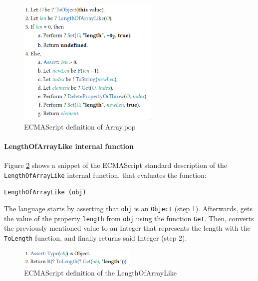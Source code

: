 \documentclass[runningheads]{llncs}
\begin{document}
\begin{figure}[ht]
    \centering
    \includegraphics[width=0.6\textwidth]{images/array_pop.png}
    \caption{ECMAScript definition of Array.pop}
    \label{fig:Array_pop}
\end{figure}



\paragraph*{LengthOfArrayLike internal function}
Figure \ref{fig:LengthOfArrayLike} shows a snippet of the ECMAScript standard description of the \texttt{LengthOfArrayLike} internal function, that evaluates the function:

\begin{center}
\texttt{LengthOfArrayLike (obj)}
\end{center}

\noindent The language starts by asserting that \texttt{obj} is an \texttt{Object} (step 1). Afterwards, gets the value of the property \texttt{length} from \texttt{obj} using the function \texttt{Get}. Then, converts the previously mentioned value to an Integer that represents the length with the \texttt{ToLength} function, and finally returns said Integer (step 2).

\begin{figure}[ht]
    \centering
    \includegraphics[width=0.5\textwidth]{images/length_array_like.png}
    \caption{ECMAScript definition of the LengthOfArrayLike}
    \label{fig:LengthOfArrayLike}
\end{figure}
\end{document}
